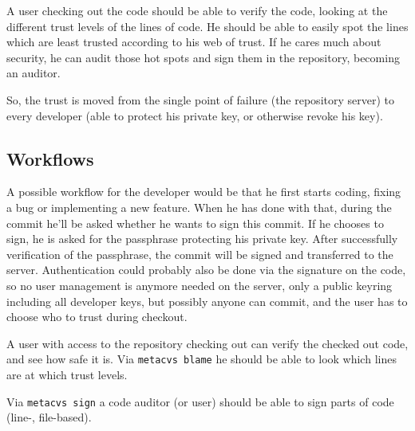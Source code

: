 \documentclass[fleqn, german, 10pt, a4paper]{article}
\begin{document}
A user checking out the code should be able to verify the code, looking
at the different trust levels of the lines of code.
He should be able to easily spot the lines
which are least trusted according to his web of trust. If he cares much
about security, he can audit those hot spots and sign them in the repository,
becoming an auditor.

So, the trust is moved from the single point of failure (the repository
server) to every developer (able to protect his private key, or otherwise
revoke his key).

\subsection{Workflows}
A possible workflow for the developer would be that he first starts coding,
fixing a bug or implementing a new feature. When he has done with that,
during the commit he'll be asked whether he wants to sign this commit.
If he chooses to sign, he is asked for the passphrase protecting
his private key. After successfully verification of the passphrase,
the commit will be signed and transferred to the server.
Authentication could probably also be done via the signature on the code,
so no user management is anymore needed on the server, only a public keyring
including all developer keys, but possibly anyone can commit, and the user
has to choose who to trust during checkout.

A user with access to the repository checking out can verify the checked
out code, and see how safe it is.
Via \texttt{metacvs blame} he should be able to look which lines are
at which trust levels.

Via \texttt{metacvs sign} a code auditor (or user) should be able to
sign parts of code (line-, file-based).
\end{document}
